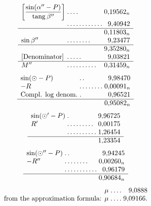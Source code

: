 \[
\begin{array}{l@{\;}l@{\;}r}
\left[\dfrac{\sin(\alpha''-P)}{\operatorname{tang}\beta''}\right]&\mathord{.}\,\mathord{.}\,\mathord{.}\,\mathord{.}&0{,}19562_n\\[3pt]
&\mathord{.}\,\mathord{.}\,\mathord{.}\,\mathord{.}\,\mathord{.}\,\mathord{.}\,\mathord{.}\,\mathord{.}\,\mathord{.}\,\mathord{.}\,\mathord{.}\,\mathord{.}&9{,}40942\\\hline
&&0{,}11803_n\\
\sin\beta''&\mathord{.}\,\mathord{.}\,\mathord{.}\,\mathord{.}\,\mathord{.}\,\mathord{.}\,\mathord{.}\,\mathord{.}&9{,}23477\\\hline
&&9{,}35280_n\\
{}[\text{Denominator}]&\mathord{.}\,\mathord{.}\,\mathord{.}\,\mathord{.}\,\mathord{.}&9{,}03821\\\hline
M''&\mathord{.}\,\mathord{.}\,\mathord{.}\,\mathord{.}\,\mathord{.}\,\mathord{.}\,\mathord{.}\,\mathord{.}\,\mathord{.}\,\mathord{.}&0{,}31459_n
\end{array}
\]
\[
\begin{array}{l@{\;}l@{\;}r}
\sin(\odot-P)&\mathord{.}\,\mathord{.}&9{,}98470\\
-R&\mathord{.}\,\mathord{.}\,\mathord{.}\,\mathord{.}\,\mathord{.}\,\mathord{.}\,\mathord{.}\,\mathord{.}&0{,}00091_n\\
\text{Compl. log denom.}&\mathord{.}&0{,}96521\\\hline
&&0{,}95082_n
\end{array}
\]
\[
\begin{array}{l@{\;}l@{\;}r}
\sin(\odot'-P)&\mathord{.}&9{,}96725\\
R'&\mathord{.}\,\mathord{.}\,\mathord{.}\,\mathord{.}\,\mathord{.}\,\mathord{.}\,\mathord{.}\,\mathord{.}\,\mathord{.}&0{,}00175\\
&\mathord{.}\,\mathord{.}\,\mathord{.}\,\mathord{.}\,\mathord{.}\,\mathord{.}\,\mathord{.}\,\mathord{.}\,\mathord{.}\,\mathord{.}&1{,}26454\\\hline
&&1{,}23354
\end{array}
\]
\[
\begin{array}{l@{\;}l@{\;}r}
\sin(\odot''-P)&\mathord{.}\,\mathord{.}&9{,}94245\\
-R''&\mathord{.}\,\mathord{.}\,\mathord{.}\,\mathord{.}\,\mathord{.}\,\mathord{.}\,\mathord{.}\,\mathord{.}&0{,}00260_n\\
&\mathord{.}\,\mathord{.}\,\mathord{.}\,\mathord{.}\,\mathord{.}\,\mathord{.}\,\mathord{.}\,\mathord{.}\,\mathord{.}\,\mathord{.}\,\mathord{.}&0{,}96179\\\hline
&&0{,}90684_n
\end{array}
\]
\[
\begin{array}{r@{\;}l@{\;}r}
\mu&\mathord{.}\,\mathord{.}\,\mathord{.}\,\mathord{.}&9{,}0888\\
\text{from the approximation formula: }\mu&\mathord{.}\,\mathord{.}\,\mathord{.}\,\mathord{.}&9{,}09166.
\end{array}
\]

